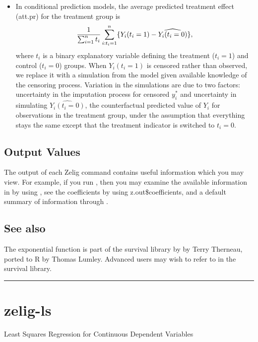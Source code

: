 \documentclass[letterpaper,10pt,english]{sphinxmanual}
\begin{document}
\begin{itemize}
\item {} 
In conditional prediction models, the average predicted treatment
effect (att.pr) for the treatment group is
\begin{gather}
\begin{split}\frac{1}{\sum_{i=1}^n t_i} \sum_{i:t_i=1}^n \{  Y_i(t_i=1) -
\widehat{Y_i(t_i=0)} \},\end{split}\notag
\end{gather}
where \(t_i\) is a binary explanatory variable defining the
treatment (\(t_i=1\)) and control (\(t_i=0\)) groups. When
\(Y_i(t_i=1)\) is censored rather than observed, we replace it
with a simulation from the model given available knowledge of the
censoring process. Variation in the simulations are due to two
factors: uncertainty in the imputation process for censored
\(y_i^*\) and uncertainty in simulating
\(\widehat{Y_i(t_i=0)}\), the counterfactual predicted value of
\(Y_i\) for observations in the treatment group, under the
assumption that everything stays the same except that the treatment
indicator is switched to \(t_i=0\).

\end{itemize}


\subsection{Output Values}
\label{vignette:id17}
The output of each Zelig command contains useful information which you
may view. For example, if you run
, then you may
examine the available information in  by using
, see the coefficients by using z.out\$coefficients, and
a default summary of information through .


\subsection{See also}
\label{vignette:id18}
The exponential function is part of the survival library by by Terry
Therneau, ported to R by Thomas Lumley. Advanced users may wish to refer
to  in the survival library.


\bigskip\hrule{}\bigskip



\section{zelig-ls}
\label{vignette:zelig-ls}\label{vignette:zls}
Least Squares Regression for Continuous Dependent Variables
\end{document}

